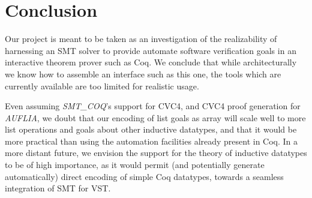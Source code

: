 \documentclass[onecolumn, preprint]{sigplanconf}
\begin{document}
\section{Conclusion}
\label{sec:conclusion}
Our project is meant to be taken as an investigation of the realizability of harnessing an SMT solver to provide automate software verification goals in an interactive theorem prover such as Coq. We conclude that while architecturally we know how to assemble an interface such as this one, the tools which are currently available are too limited for realistic usage.




Even assuming \emph{SMT\_COQ}'s support for CVC4, and CVC4 proof generation for \emph{AUFLIA}, we doubt that our encoding of list goals as array will scale well to more list operations and goals about other inductive datatypes, and that it would be more practical than using the automation facilities already present in Coq. In a more distant future, we envision the support for the theory of inductive datatypes to be of high importance, as it would permit (and potentially generate automatically)  direct encoding of simple Coq datatypes, towards a seamless integration of SMT for VST.



\end{document}
